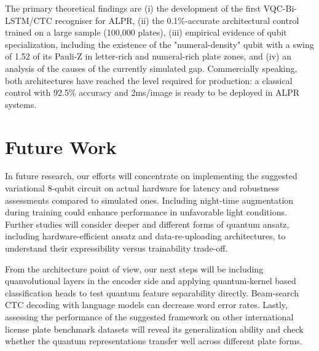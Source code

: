 \documentclass{ieeeaccess}
\begin{document}
The primary theoretical findings are (i) the development of the first VQC-Bi-LSTM/CTC recogniser for ALPR, (ii) the 0.1\%-accurate architectural control trained on a large sample (100,000 plates), (iii) empirical evidence of qubit specialization, including the existence of the "numeral-density" qubit with a swing of 1.52 of its Pauli-Z in letter-rich and numeral-rich plate zones, and (iv) an analysis of the causes of the currently simulated gap. Commercially speaking, both architectures have reached the level required for production: a classical control with 92.5\% accuracy and 2ms/image is ready to be deployed in ALPR systems.

\section{Future Work}
In future research, our efforts will concentrate on implementing the suggested variational 8-qubit circuit on actual hardware for latency and robustness assessments compared to simulated ones. Including night-time augmentation during training could enhance performance in unfavorable light conditions. Further studies will consider deeper and different forms of quantum ansatz, including hardware-efficient ansatz and data-re-uploading architectures, to understand their expressibility versus trainability trade-off.

From the architecture point of view, our next steps will be including quanvolutional layers in the encoder side and applying quantum-kernel based classification heads to test quantum feature separability directly. Beam-search CTC decoding with language models can decrease word error rates. Lastly, assessing the performance of the suggested framework on other international license plate benchmark datasets will reveal its generalization ability and check whether the quantum representations transfer well across different plate forms.
\end{document}
